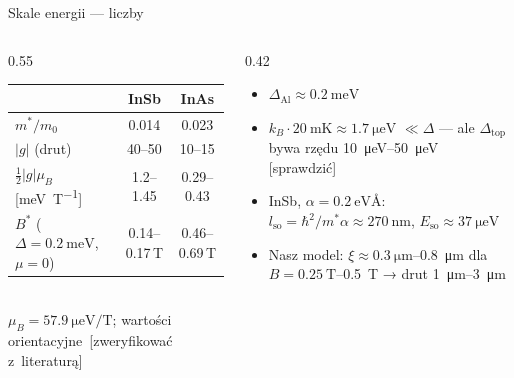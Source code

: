 \documentclass[aspectratio=169,10pt]{beamer}
\newcommand{\sprawdz}[1][sprawdzić]{\textcolor{mRed}{\scriptsize\,[#1]}}
\begin{document}
\begin{frame}{Skale energii — liczby}
  \begin{columns}[T]
    \begin{column}{0.55\textwidth}
      \centering
      \begin{tabular}{@{}lcc@{}}
        \toprule
        & InSb & InAs \\
        \midrule
        $m^*/m_0$ & 0.014 & 0.023 \\
        $|g|$ (drut) & 40–50 & 10–15 \\
        $\tfrac12|g|\mu_B$ [\unit{\milli\electronvolt\per\tesla}] & 1.2–1.45 & 0.29–0.43 \\
        $B^*$ ($\Delta=\qty{0.2}{\milli\electronvolt}$, $\mu=0$) & \alert{0.14–0.17\,T} & \alert{0.46–0.69\,T} \\
        \bottomrule
      \end{tabular}\\[2mm]
      {\footnotesize $\mu_B = \qty{57.9}{\micro\electronvolt\per\tesla}$; wartości
      orientacyjne \sprawdz[zweryfikować z~literaturą]}
    \end{column}
    \begin{column}{0.42\textwidth}
      \begin{itemize}
        \item $\Delta_\mathrm{Al} \approx \qty{0.2}{\milli\electronvolt}$
        \item $k_B\cdot\qty{20}{\milli\kelvin} \approx \qty{1.7}{\micro\electronvolt}$
              $\ll \Delta$ — ale $\Delta_\mathrm{top}$ bywa rzędu
              \qty{10}{\micro\electronvolt}–\qty{50}{\micro\electronvolt} \sprawdz
        \item InSb, $\alpha = \qty{0.2}{\electronvolt\angstrom}$:
              $l_\mathrm{so} = \hbar^2/m^*\alpha \approx \qty{270}{\nano\metre}$,
              $E_\mathrm{so}\approx\qty{37}{\micro\electronvolt}$
        \item Nasz model: $\xi\approx\qty{0.3}{\micro\metre}$–\qty{0.8}{\micro\metre}
              dla $B=\qty{0.25}{\tesla}$–\qty{0.5}{\tesla}
              → drut \alert{\qty{1}{\micro\metre}–\qty{3}{\micro\metre}}
      \end{itemize}
    \end{column}
  \end{columns}
\end{frame}
\end{document}
